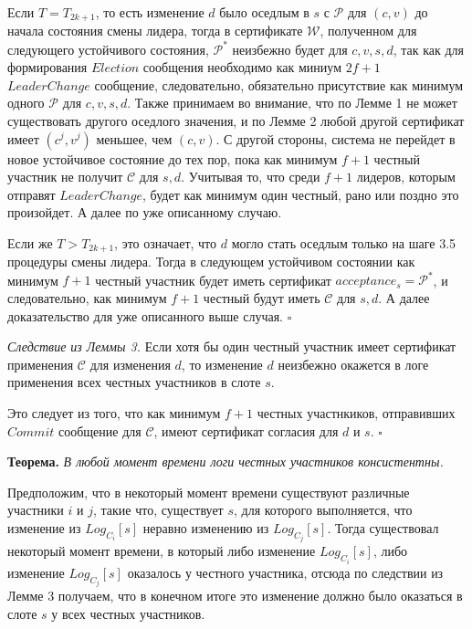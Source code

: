 Если $T= T_{2k+1}$, то есть изменение $d$ было оседлым в $s$ с $\mathcal{P}$ для $(c, v)$ до начала состояния смены лидера, тогда в сертификате $\mathcal{W}$, полученном для следующего устойчивого состояния, $\mathcal{P}^{*}$ неизбежно будет для $c, v, s, d$, так как для формирования $Election$ сообщения необходимо как миниум $2f+1$ $LeaderChange$ сообщение, следовательно, обязательно присутствие как минимум одного $\mathcal{P}$ для $c, v, s, d$. Также принимаем во внимание, что по Лемме 1 не может существовать другого оседлого значения, и по Лемме 2 любой другой сертификат имеет $(c^j, v^j)$ меньшее, чем $(c, v)$. С другой стороны, система не перейдет в новое устойчивое состояние до тех пор, пока как минимум $f+1$ честный участник не получит $\mathcal{C}$ для $s, d$. Учитывая то, что среди $f+1$ лидеров, которым отправят $LeaderChange$, будет как минимум один честный, рано или поздно это произойдет. А далее по уже описанному случаю.

Если же  $T > T_{2k+1}$, это означает, что $d$ могло стать оседлым только на шаге 3.5 процедуры смены лидера. Тогда в следующем устойчивом состоянии как минимум $f+1$ честный участник будет иметь сертификат $acceptance_s = \mathcal{P}^{*}$, и следовательно, как минимум $f+1$ честный будут иметь $\mathcal{C}$ для $s, d$. А далее доказательство для уже описанного выше случая.
$\square$
\vspace{10pt}

\textit{Следствие из Леммы 3.} Если хотя бы один честный участник имеет сертификат применения $\mathcal{C}$ для изменения $d$, то  изменение $d$ неизбежно окажется в логе применения всех честных участников в слоте $s$. 

Это следует из того, что как минимум $f+1$ честных участнкиков, отправивших $Commit$ сообщение для $\mathcal{C}$, имеют сертификат согласия для $d$ и $s$. $\square$
\vspace{10pt}

\textbf{Теорема.} \textit{В любой момент времени логи честных участников консистентны.}

Предположим, что в некоторый момент времени существуют различные участники $i$ и $j$, такие что, существует $s$, для которого выполняется, что изменение из $Log_{C_i}[s]$ неравно изменению из $Log_{C_j}[s]$. Тогда существовал некоторый момент времени, в который либо изменение $Log_{C_i}[s]$, либо изменение $Log_{C_j}[s]$ оказалось у честного участника, отсюда по следствии из Лемме 3 получаем, что в конечном итоге это изменение должно было оказаться в слоте $s$ у всех честных участников.

